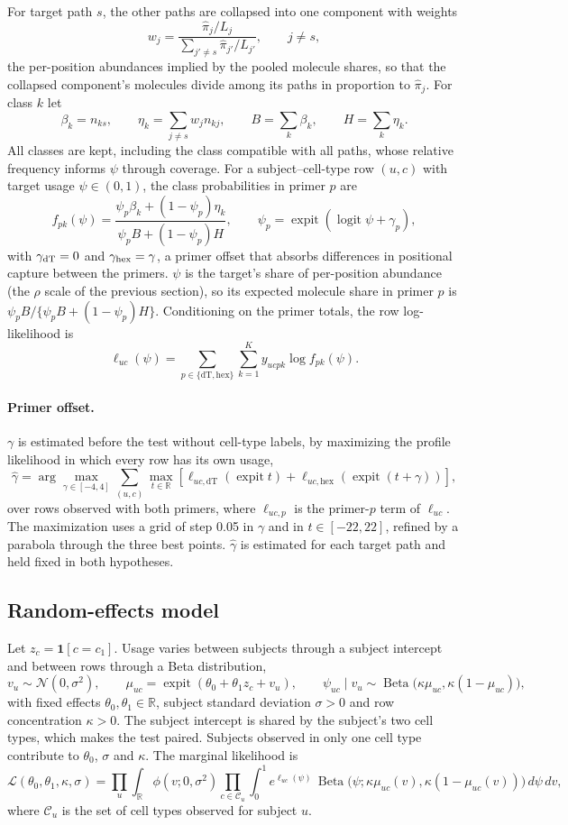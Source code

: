 \documentclass[11pt]{article}
\newcommand{\expit}{\operatorname{expit}}
\newcommand{\logit}{\operatorname{logit}}
\newcommand{\BetaDist}{\operatorname{Beta}}
\begin{document}
For target path $s$, the other paths are collapsed into one component with weights \[w_j=\frac{\widehat\pi_j/L_j}{\sum_{j'\ne s}\widehat\pi_{j'}/L_{j'}},\qquad j\neq s,\] the per-position abundances implied by the pooled molecule shares, so that the collapsed component's molecules divide among its paths in proportion to $\widehat\pi_j$. For class $k$ let \[\beta_k=n_{ks},\qquad \eta_k=\sum_{j\ne s}w_jn_{kj},\qquad B=\sum_k\beta_k,\qquad H=\sum_k\eta_k.\] All classes are kept, including the class compatible with all paths, whose relative frequency informs $\psi$ through coverage. For a subject--cell-type row $(u,c)$ with target usage $\psi\in(0,1)$, the class probabilities in primer $p$ are \[f_{pk}(\psi)=\frac{\psi_p\beta_k+(1-\psi_p)\eta_k}{\psi_pB+(1-\psi_p)H},\qquad \psi_p=\expit(\logit\psi+\gamma_p),\] with $\gamma_{\rm dT}=0$ and $\gamma_{\rm hex}=\gamma$, a primer offset that absorbs differences in positional capture between the primers. $\psi$ is the target's share of per-position abundance (the $\rho$ scale of the previous section), so its expected molecule share in primer $p$ is $\psi_pB/\{\psi_pB+(1-\psi_p)H\}$. Conditioning on the primer totals, the row log-likelihood is \[\ell_{uc}(\psi)=\sum_{p\in\{\mathrm{dT},\mathrm{hex}\}}\sum_{k=1}^Ky_{ucpk}\log f_{pk}(\psi).\] 
\paragraph{Primer offset.} $\gamma$ is estimated before the test without cell-type labels, by maximizing the profile likelihood in which every row has its own usage, \[\widehat\gamma=\arg\max_{\gamma\in[-4,4]}\sum_{(u,c)}\max_{t\in\mathbb R}\left[\ell_{uc,\mathrm{dT}}(\expit t)+\ell_{uc,\mathrm{hex}}(\expit(t+\gamma))\right],\] over rows observed with both primers, where $\ell_{uc,p}$ is the primer-$p$ term of $\ell_{uc}$. The maximization uses a grid of step 0.05 in $\gamma$ and in $t\in[-22,22]$, refined by a parabola through the three best points. $\widehat\gamma$ is estimated for each target path and held fixed in both hypotheses.

\subsection{Random-effects model}

Let $z_c=\mathbf 1[c=c_1]$. Usage varies between subjects through a subject intercept and between rows through a Beta distribution, \[v_u\sim\mathcal N(0,\sigma^2),\qquad \mu_{uc}=\expit(\theta_0+\theta_1z_c+v_u),\qquad \psi_{uc}\mid v_u\sim\BetaDist\big(\kappa\mu_{uc},\kappa(1-\mu_{uc})\big),\] with fixed effects $\theta_0,\theta_1\in\mathbb R$, subject standard deviation $\sigma>0$ and row concentration $\kappa>0$. The subject intercept is shared by the subject's two cell types, which makes the test paired. Subjects observed in only one cell type contribute to $\theta_0$, $\sigma$ and $\kappa$. The marginal likelihood is \[\mathcal L(\theta_0,\theta_1,\kappa,\sigma)=\prod_u\int_{\mathbb R}\phi(v;0,\sigma^2)\prod_{c\in\mathcal C_u}\int_0^1e^{\ell_{uc}(\psi)}\,\BetaDist\big(\psi;\kappa\mu_{uc}(v),\kappa(1-\mu_{uc}(v))\big)\,d\psi\,dv,\] where $\mathcal C_u$ is the set of cell types observed for subject $u$.
\end{document}
